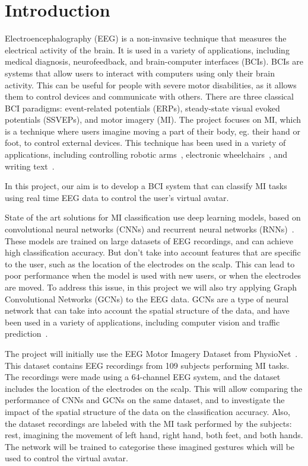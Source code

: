\chapter{Introduction}\label{ch:introduction}
Electroencephalography (EEG) is a non-invasive technique that measures the electrical activity of the brain.
It is used in a variety of applications, including medical diagnosis, neurofeedback, and brain-computer interfaces (BCIs).
BCIs are systems that allow users to interact with computers using only their brain activity.
This can be useful for people with severe motor disabilities, as it allows them to control devices and communicate with others.
There are three classical BCI paradigms: event-related potentials (ERPs), steady-state visual evoked potentials (SSVEPs), and motor imagery (MI).
The project focuses on MI, which is a technique where users imagine moving a part of their body, eg. their hand or foot, to control external devices.
This technique has been used in a variety of applications, including controlling robotic arms~\cite{ang2009clinical}, electronic wheelchairs~\cite{palumbo2021motor}, and writing text~\cite{zhang2018converting}.

In this project, our aim is to develop a BCI system that can classify MI tasks using real time EEG data to control the user's virtual avatar.

State of the art solutions for MI classification use deep learning models, based on convolutional neural networks (CNNs) and recurrent neural networks (RNNs)~\cite{li2022motor}.
These models are trained on large datasets of EEG recordings, and can achieve high classification accuracy.
But don't take into account features that are specific to the user, such as the location of the electrodes on the scalp.
This can lead to poor performance when the model is used with new users, or when the electrodes are moved.
To address this issue, in this project we will also try applying Graph Convolutional Networks (GCNs) to the EEG data.
GCNs are a type of neural network that can take into account the spatial structure of the data, and have been used in a variety of applications, including computer vision and traffic prediction~\cite{zhang2019graph}.

The project will initially use the EEG Motor Imagery Dataset from PhysioNet~\cite{goldberger2000physiobank, schalk2004bci2000}.
This dataset contains EEG recordings from 109 subjects performing MI tasks.
The recordings were made using a 64-channel EEG system, and the dataset includes the location of the electrodes on the scalp.
This will allow comparing the performance of CNNs and GCNs on the same dataset, and to investigate the impact of the spatial structure of the data on the classification accuracy.
Also, the dataset recordings are labeled with the MI task performed by the subjects: rest, imagining the movement of left hand, right hand, both feet, and both hands.
The network will be trained to categorise these imagined gestures which will be used to control the virtual avatar.


